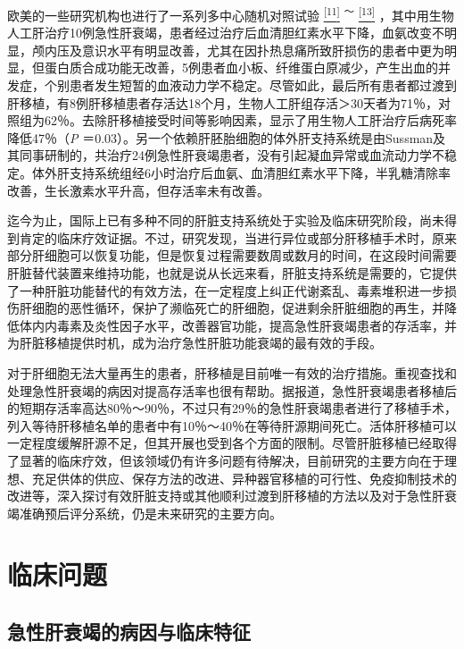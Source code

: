 欧美的一些研究机构也进行了一系列多中心随机对照试验
\protect\hyperlink{text00019.htmlux5cux23ch11-18}{\textsuperscript{{[}11{]}}}
\textsuperscript{～}
\protect\hyperlink{text00019.htmlux5cux23ch13-18}{\textsuperscript{{[}13{]}}}
，其中用生物人工肝治疗10例急性肝衰竭，患者经过治疗后血清胆红素水平下降，血氨改变不明显，颅内压及意识水平有明显改善，尤其在因扑热息痛所致肝损伤的患者中更为明显，但蛋白质合成功能无改善，5例患者血小板、纤维蛋白原减少，产生出血的并发症，个别患者发生短暂的血液动力学不稳定。尽管如此，最后所有患者都过渡到肝移植，有8例肝移植患者存活达18个月，生物人工肝组存活＞30天者为71％，对照组为62％。去除肝移植接受时间等影响因素，显示了用生物人工肝治疗后病死率降低47％（\emph{P}
＝0.03）。另一个依赖肝胚胎细胞的体外肝支持系统是由Sussman及其同事研制的，共治疗24例急性肝衰竭患者，没有引起凝血异常或血流动力学不稳定。体外肝支持系统组经6小时治疗后血氨、血清胆红素水平下降，半乳糖清除率改善，生长激素水平升高，但存活率未有改善。

迄今为止，国际上已有多种不同的肝脏支持系统处于实验及临床研究阶段，尚未得到肯定的临床疗效证据。不过，研究发现，当进行异位或部分肝移植手术时，原来部分肝细胞可以恢复功能，但是恢复过程需要数周或数月的时间，在这段时间需要肝脏替代装置来维持功能，也就是说从长远来看，肝脏支持系统是需要的，它提供了一种肝脏功能替代的有效方法，在一定程度上纠正代谢紊乱、毒素堆积进一步损伤肝细胞的恶性循环，保护了濒临死亡的肝细胞，促进剩余肝脏细胞的再生，并降低体内内毒素及炎性因子水平，改善器官功能，提高急性肝衰竭患者的存活率，并为肝脏移植提供时机，成为治疗急性肝脏功能衰竭的最有效的手段。

对于肝细胞无法大量再生的患者，肝移植是目前唯一有效的治疗措施。重视查找和处理急性肝衰竭的病因对提高存活率也很有帮助。据报道，急性肝衰竭患者移植后的短期存活率高达80％～90％，不过只有29％的急性肝衰竭患者进行了移植手术，列入等待肝移植名单的患者中有10％～40％在等待肝源期间死亡。活体肝移植可以一定程度缓解肝源不足，但其开展也受到各个方面的限制。尽管肝脏移植已经取得了显著的临床疗效，但该领域仍有许多问题有待解决，目前研究的主要方向在于理想、充足供体的供应、保存方法的改进、异种器官移植的可行性、免疫抑制技术的改进等，深入探讨有效肝脏支持或其他顺利过渡到肝移植的方法以及对于急性肝衰竭准确预后评分系统，仍是未来研究的主要方向。

\section{临床问题}

\subsection{急性肝衰竭的病因与临床特征}

